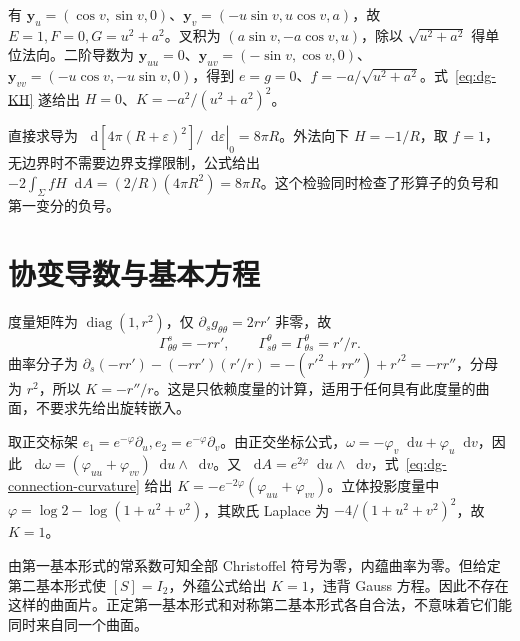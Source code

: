 \documentclass[UTF8,12pt,a4paper,fontset=fandol]{ctexbook}
\newcommand{\dd}{\mathop{}\!\mathrm d}
\begin{document}
\begin{solve}
有 $\mathbf y_u=(\cos v,\sin v,0)$、$\mathbf y_v=(-u\sin v,u\cos v,a)$，故 $E=1,F=0,G=u^2+a^2$。叉积为 $(a\sin v,-a\cos v,u)$，除以 $\sqrt{u^2+a^2}$ 得单位法向。二阶导数为 $\mathbf y_{uu}=0$、$\mathbf y_{uv}=(-\sin v,\cos v,0)$、$\mathbf y_{vv}=(-u\cos v,-u\sin v,0)$，得到 $e=g=0$、$f=-a/\sqrt{u^2+a^2}$。式~\eqref{eq:dg-KH} 遂给出 $H=0$、$K=-a^2/(u^2+a^2)^2$。
\end{solve}

\begin{solve}
直接求导为 $\left.\dd[4\pi(R+\varepsilon)^2]/\dd\varepsilon\right|_0=8\pi R$。外法向下 $H=-1/R$，取 $f=1$，无边界时不需要边界支撑限制，公式给出 $-2\int_\Sigma fH\dd A=(2/R)(4\pi R^2)=8\pi R$。这个检验同时检查了形算子的负号和第一变分的负号。
\end{solve}

\section{协变导数与基本方程}
\begin{solve}
度量矩阵为 $\operatorname{diag}(1,r^2)$，仅 $\partial_sg_{\theta\theta}=2rr'$ 非零，故
\[
 \Gamma^s_{\theta\theta}=-rr',\qquad
 \Gamma^\theta_{s\theta}=\Gamma^\theta_{\theta s}=r'/r.
\]
曲率分子为 $\partial_s(-rr')-(-rr')(r'/r)=-(r'^2+rr'')+r'^2=-rr''$，分母为 $r^2$，所以 $K=-r''/r$。这是只依赖度量的计算，适用于任何具有此度量的曲面，不要求先给出旋转嵌入。
\end{solve}

\begin{solve}
取正交标架 $e_1=e^{-\varphi}\partial_u,e_2=e^{-\varphi}\partial_v$。由正交坐标公式，$\omega=-\varphi_v\dd u+\varphi_u\dd v$，因此 $\dd\omega=(\varphi_{uu}+\varphi_{vv})\dd u\wedge\dd v$。又 $\dd A=e^{2\varphi}\dd u\wedge\dd v$，式~\eqref{eq:dg-connection-curvature} 给出 $K=-e^{-2\varphi}(\varphi_{uu}+\varphi_{vv})$。立体投影度量中 $\varphi=\log2-\log(1+u^2+v^2)$，其欧氏 Laplace 为 $-4/(1+u^2+v^2)^2$，故 $K=1$。
\end{solve}

\begin{solve}
由第一基本形式的常系数可知全部 Christoffel 符号为零，内蕴曲率为零。但给定第二基本形式使 $[S]=I_2$，外蕴公式给出 $K=1$，违背 Gauss 方程。因此不存在这样的曲面片。正定第一基本形式和对称第二基本形式各自合法，不意味着它们能同时来自同一个曲面。
\end{solve}
\end{document}
